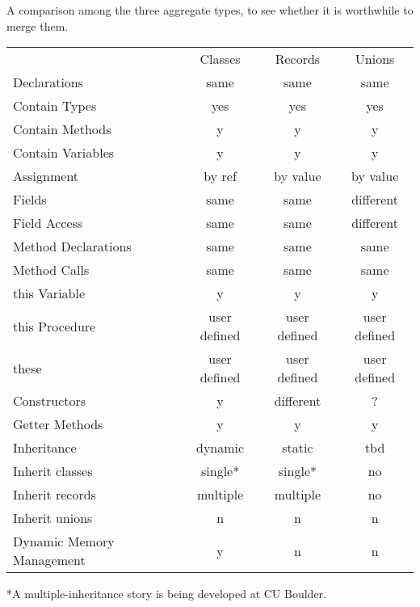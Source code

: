 
A comparison among the three aggregate types, to see whether it is worthwhile to merge them.

\begin{tabular}{lccc}
& Classes & Records & Unions \\
Declarations & same & same & same \\
Contain Types & yes & yes & yes \\
Contain Methods & y & y & y \\
Contain Variables & y & y & y \\
Assignment & by ref & by value & by value \\
Fields & same & same & different \\
Field Access & same & same & different \\
Method Declarations & same & same & same \\
Method Calls & same & same & same \\
this Variable & y & y & y \\
this Procedure & user defined & user defined & user defined \\
these & user defined & user defined & user defined \\
Constructors & y & different & ? \\
Getter Methods & y & y & y \\
Inheritance & dynamic & static & tbd \\
Inherit classes & single* & single* & no \\
Inherit records & multiple & multiple & no \\
Inherit unions & n & n & n \\
Dynamic Memory Management & y & n & n \\
\end{tabular}
*A multiple-inheritance story is being developed at CU Boulder.

